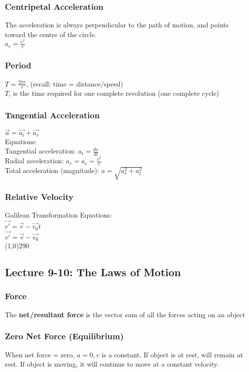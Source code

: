 \documentclass[10 pt]{article}
\begin{document}
\begin{multicols}{2}
\subsubsection*{Centripetal Acceleration}
\noindent The acceleration is always perpendicular to the path of motion, and points toward the centre of the circle.\\
\indent $a_c = \frac{v^2}{r}$
\subsubsection*{Period}
$T = \frac{2 \pi r}{v}$, (recall: time = distance/speed)\\
$T$, is the time required for one complete revolution (one complete cycle)
\subsubsection*{Tangential Acceleration}
$\vec{a} = \vec{a_t} + \vec{a_r}$\\
Equations:\\
\indent Tangential acceleration: $a_t = \frac{dv}{dt}$\\
\indent Radial acceleration: $a_r = a_c = \frac{v^2}{r}$\\
\indent Total acceleration (magnitude): $a = \sqrt{a_r^2 + a_t^2}$
\subsubsection*{Relative Velocity}
\noindent Galilean Transformation Equations:\\
\indent $\vec{r'} = \vec{r} - \vec{v_0}t$\\
\indent $\vec{v'} = \vec{v} - \vec{v_0}$\\
\line(1,0){290}
\subsection*{Lecture 9-10: The Laws of Motion}
\subsubsection*{Force}
\noindent The \textbf{net/resultant force} is the vector sum of all the forces acting on an object
\subsubsection*{Zero Net Force (Equilibrium)}
\noindent When net force = zero, $a=0, v $ is a constant. If object is at rest, will remain at rest. If object is moving, it will continue to move at a constant velocity.

\end{multicols}
\end{document}
